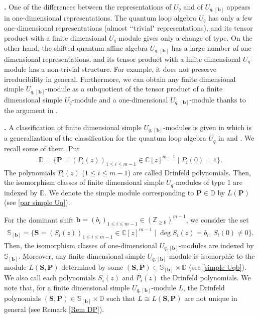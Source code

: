 \documentclass[12pt]{amsart}
\def \para{\refstepcounter{thm} \par\medskip\noindent
                \textbf{\thethm .} }
\numberwithin{equation}{thm}
\newcommand\CC{\mathbb C}
\newcommand\DD{\mathbb D}
\renewcommand\SS{\mathbb S} %
\newcommand\ZZ{\mathbb Z}
\newcommand\bP{\mathbf P}
\newcommand\bS{\mathbf S}
\newcommand\bb{\mathbf b}
\newcounter{ni}
\begin{document}
\para 
One of the differences between the representations of $U_{q}$ and of $U_{q,[\bb]}$ 
appears in one-dimensional representations. 
The quantum loop algebra $U_q $ has only a few one-dimensional representations (almost \lq\lq trivial" representations), 
and its tensor product with a finite dimensional $U_q $-module gives only a change of type. 
On the other hand, the shifted quantum affine algebra $U_{q,[\bb]}$ has a large number of one-dimensional representations, 
and its tensor product with  a finite dimensional $U_q $-module has a non-trivial structure. 
For example, it does not preserve irreducibility in general. 
Furthermore, we can obtain any finite dimensional simple $U_{q,[\bb]} $-module 
as a subquotient of the tensor product of a finite dimensional simple $U_q$-module 
and a one-dimensional $U_{q,[\bb]}$-module thanks to the argument in \cite{Her23}. 

\para 
A classification of finite dimensional simple $U_{q,[\bb]}$-modules is given in \cite{Her23} 
which is  a generalization of the classification for the quantum loop algebra $U_q$ in \cite{CP91} and \cite{CP95}. 
We recall some of them. 
Put 
\begin{align*}
\DD = \{ \bP = (P_i(z))_{1 \leq i \leq m-1}  \in \CC [z]^{m-1} \mid  P_i(0) =1\}. 
\end{align*}
The polynomials $P_i(z)$ ($1 \leq i \leq m-1$)  are called Drinfeld polynomials. 
Then, the isomorphism classes of finite dimensional simple $U_q $-modules of type $1$  
are indexed by $\DD$. 
We denote the simple module corresponding to $\bP \in \DD$ by $L(\bP)$ 
(see \ref{par simple Uq}). 

For the dominant shift $\bb =(b_i)_{1 \leq i \leq m-1} \in (\ZZ_{\geq 0})^{m-1}$, 
we consider the set 
\begin{align*}
\SS_{[\bb]} = \{ \bS = (S_i(z))_{1 \leq i \leq m-1} \in \CC [z]^{m-1} \mid \deg S_i(z) = b_i, \, S_i(0) \not=0\}. 
\end{align*}
Then, the isomorphism classes of one-dimensional $U_{q,[\bb]}$-modules are indexed by $\SS_{[\bb]}$. 
Moreover, any finite dimensional simple $U_{q,[\bb]}$-module is isomorphic to the module 
$L(\bS, \bP)$ determined by some $(\bS, \bP) \in \SS_{[\bb]} \times \DD$ (see \ref{simple Uqb}). 
We also call each polynomials $S_i(z)$ and $P_i(z)$ the Drinfeld  polynomials. 
We note that, 
for a finite dimensional simple $U_{q,[\bb]}$-module $L$, 
the Drinfeld polynomials $(\bS, \bP) \in \SS_{[\bb]} \times \DD$ such that $L \cong L(\bS, \bP)$ 
are not unique in general (see Remark \ref{Rem DP}).  
\end{document}
